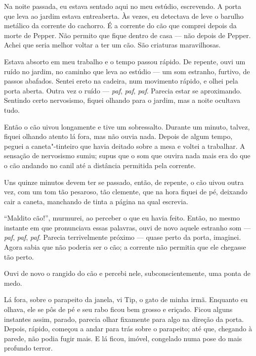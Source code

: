 Na noite passada, eu estava sentado aqui no meu estúdio, escrevendo. A porta que leva ao jardim estava entreaberta. Às
vezes, eu detectava de leve o barulho metálico da corrente do cachorro. É a corrente do cão que comprei depois da morte de
Pepper. Não permito que fique dentro de casa --- não depois de Pepper. Achei que seria melhor voltar a ter um cão. São criaturas
maravilhosas.

Estava absorto em meu trabalho e o tempo passou rápido. De repente, ouvi um ruído no jardim, no caminho que leva ao
estúdio --- um som estranho, furtivo, de passos abafados. Sentei ereto na cadeira, num movimento rápido, e olhei pela
porta aberta. Outra vez o ruído --- \textit{paf}, \textit{paf}, \textit{paf}. Parecia estar se aproximando. Sentindo
certo nervosismo, fiquei olhando para o jardim, mas a noite ocultava tudo. 

Então o cão uivou longamente e tive um sobressalto. Durante um minuto, talvez, fiquei olhando atento lá fora,
mas não ouvia nada. Depois de algum tempo, peguei a caneta"-tinteiro que havia deitado sobre a mesa e voltei a
trabalhar. A sensação de nervosismo sumiu; supus que o som que ouvira nada mais era do que o cão andando no canil até a
distância permitida pela corrente.

Uns quinze minutos devem ter se passado, então, de repente, o cão uivou outra vez, com um tom tão pesaroso, tão
clemente, que na hora fiquei de pé, deixando cair a caneta, manchando de tinta a página na qual escrevia. 

``Maldito cão!'', murmurei, ao perceber o que eu havia feito. Então, no mesmo instante em que pronunciava essas palavras,
ouvi de novo aquele estranho som --- \textit{paf}, \textit{paf}, \textit{paf}. Parecia terrivelmente próximo --- quase
perto da porta, imaginei. Agora sabia que não poderia ser o cão; a corrente não permitia que ele chegasse tão perto.

Ouvi de novo o rangido do cão e percebi nele, subconscientemente, uma ponta de medo.

Lá fora, sobre o parapeito da janela, vi Tip, o gato de minha irmã. Enquanto eu olhava, ele se pôs de pé e seu rabo
ficou bem grosso e eriçado. Ficou alguns instantes assim, parado, parecia olhar fixamente para algo na direção
da porta. Depois, rápido, começou a andar para trás sobre o parapeito; até que, chegando à parede, não podia fugir
mais. E lá ficou, imóvel, congelado numa pose do mais profundo terror.


